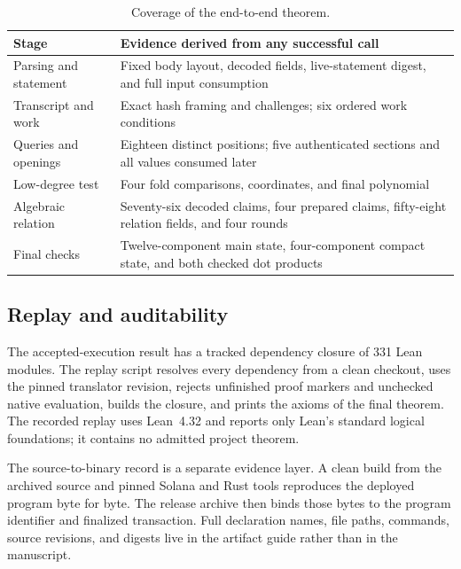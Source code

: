 \begin{table}[t]
\centering
\small
\caption{Coverage of the end-to-end theorem.}
\label{tab:implementation-coverage}
\begin{tabularx}{\textwidth}{@{}R{0.22\textwidth}Y@{}}
\toprule
Stage & Evidence derived from any successful call \\
\midrule
Parsing and statement & Fixed body layout, decoded fields, live-statement
digest, and full input consumption \\
Transcript and work & Exact hash framing and challenges; six ordered work
conditions \\
Queries and openings & Eighteen distinct positions; five authenticated
sections and all values consumed later \\
Low-degree test & Four fold comparisons, coordinates, and final polynomial \\
Algebraic relation & Seventy-six decoded claims, four prepared claims,
fifty-eight relation fields, and four rounds \\
Final checks & Twelve-component main state, four-component compact state, and
both checked dot products \\
\bottomrule
\end{tabularx}
\end{table}

\subsection{Replay and auditability}

The accepted-execution result has a tracked dependency closure of 331 Lean
modules.  The replay script resolves every dependency from a clean checkout,
uses the pinned translator revision, rejects unfinished proof markers and
unchecked native evaluation, builds the closure, and prints the axioms of the
final theorem.  The recorded replay uses Lean~4.32 and reports only Lean's
standard logical foundations; it contains no admitted project theorem.

The source-to-binary record is a separate evidence layer.  A clean build from
the archived source and pinned Solana and Rust tools reproduces the deployed
program byte for byte.  The release archive then binds those bytes to the
program identifier and finalized transaction.  Full declaration names, file
paths, commands, source revisions, and digests live in the artifact guide
rather than in the manuscript.
